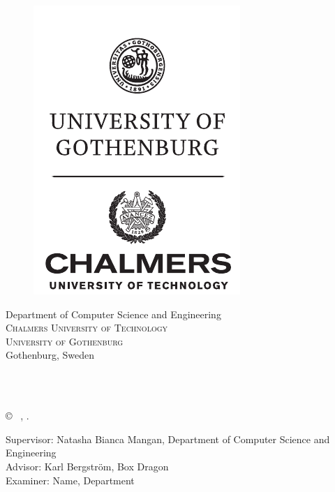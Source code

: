 {\begin{center}
	\vfill	
	\begin{figure}[H]
	\centering
	\includegraphics[width=0.25\pdfpagewidth]{figure/auxiliary/ChGULogoHog.pdf}
	\end{figure}	\vspace{5mm}	
	
	Department of Computer Science and Engineering\\
	\textsc{Chalmers University of Technology} \\
	\textsc{University of Gothenburg} \\
	Gothenburg, Sweden \the\year \\
\end{center}


\newpage
\thispagestyle{plain}
\vspace*{4.5cm}
\oneLineTitle\\
\oneLineSubtitle\\
\authorName \setlength{\parskip}{1cm}

\copyright ~ \authorName, \the\year. \setlength{\parskip}{1cm}

Supervisor: Natasha Bianca Mangan, Department of Computer Science and Engineering\\
Advisor: Karl Bergström, Box Dragon\\
Examiner: Name, Department \setlength{\parskip}{1cm}

}
